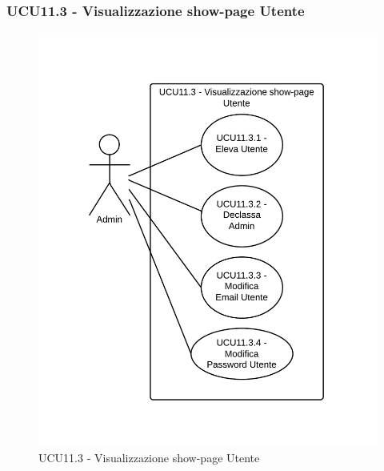 \subsubsection{UCU11.3 - Visualizzazione show-page Utente} 
    \begin{center}
    \begin{figure}[H]
      \includegraphics[scale=0.16]{UML/UCU11.3 - Visualizzazione show-page Utente.png}
      \caption{UCU11.3 - Visualizzazione show-page Utente} 
    \end{figure}
    \end{center}
    
